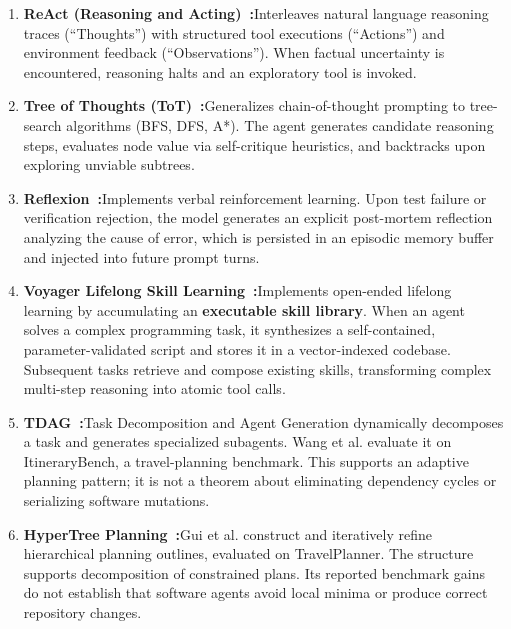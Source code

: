 \documentclass[11pt,a4paper]{article}
\begin{document}
\begin{enumerate}[leftmargin=1.8em,itemsep=3pt]
  \item \textbf{ReAct (Reasoning and Acting)~:}\enspace Interleaves natural language reasoning traces (``Thoughts'') with structured tool executions (``Actions'') and environment feedback (``Observations''). When factual uncertainty is encountered, reasoning halts and an exploratory tool is invoked.
  
  \item \textbf{Tree of Thoughts (ToT)~:}\enspace Generalizes chain-of-thought prompting to tree-search algorithms (BFS, DFS, A*). The agent generates candidate reasoning steps, evaluates node value via self-critique heuristics, and backtracks upon exploring unviable subtrees.
  
  \item \textbf{Reflexion~:}\enspace Implements verbal reinforcement learning. Upon test failure or verification rejection, the model generates an explicit post-mortem reflection analyzing the cause of error, which is persisted in an episodic memory buffer and injected into future prompt turns.

  \item \textbf{Voyager Lifelong Skill Learning~:}\enspace Implements open-ended lifelong learning by accumulating an \textbf{executable skill library}. When an agent solves a complex programming task, it synthesizes a self-contained, parameter-validated script and stores it in a vector-indexed codebase. Subsequent tasks retrieve and compose existing skills, transforming complex multi-step reasoning into atomic tool calls.

  \item \textbf{TDAG~:}\enspace Task Decomposition and Agent Generation dynamically decomposes a task and generates specialized subagents. Wang et al. evaluate it on ItineraryBench, a travel-planning benchmark. This supports an adaptive planning pattern; it is not a theorem about eliminating dependency cycles or serializing software mutations.

  \item \textbf{HyperTree Planning~:}\enspace Gui et al. construct and iteratively refine hierarchical planning outlines, evaluated on TravelPlanner. The structure supports decomposition of constrained plans. Its reported benchmark gains do not establish that software agents avoid local minima or produce correct repository changes.
\end{enumerate}
\end{document}
